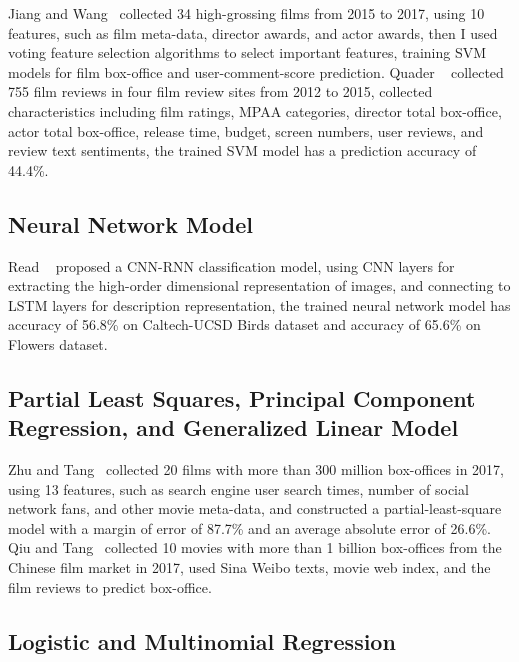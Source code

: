 \documentclass[review]{cvpr}
\begin{document}
  Jiang and Wang~\cite{jiang2018predicting} collected 34 high-grossing films from 2015 to 2017, using 10 features, such as film meta-data, director awards, and actor awards, then I used voting feature selection algorithms to select important features,
  training SVM models for film box-office and user-comment-score prediction.
  Quader \etal~\cite{quader2017machine} collected 755 film reviews in four film review sites from 2012 to 2015, collected characteristics including film ratings, MPAA categories,
  director total box-office, actor total box-office, release time, budget, screen numbers, user reviews, and review text sentiments,
  the trained SVM model has a prediction accuracy of 44.4\%.

\subsection{Neural Network Model}

  Read \etal ~\cite{read2016earning} proposed a CNN-RNN classification model, using CNN layers for extracting the high-order dimensional representation of images,
  and connecting to LSTM layers for description representation, the trained neural network model has accuracy of 56.8\% on Caltech-UCSD Birds dataset and accuracy of 65.6\% on Flowers dataset.


\subsection{Partial Least Squares, Principal Component Regression, and Generalized Linear Model}

  Zhu and Tang~\cite{zhu2019film} collected 20 films with more than 300 million box-offices in 2017, using 13 features, such as search engine user search times, number of social network fans, and other movie meta-data,
  and constructed a partial-least-square model with a margin of error of 87.7\% and an average absolute error of 26.6\%.
  Qiu and Tang~\cite{qiu2018microblog} collected 10 movies with more than 1 billion box-offices from the Chinese film market in 2017, used Sina Weibo texts, movie web index, and the film reviews to predict box-office.

\subsection{Logistic and Multinomial Regression}
\end{document}
